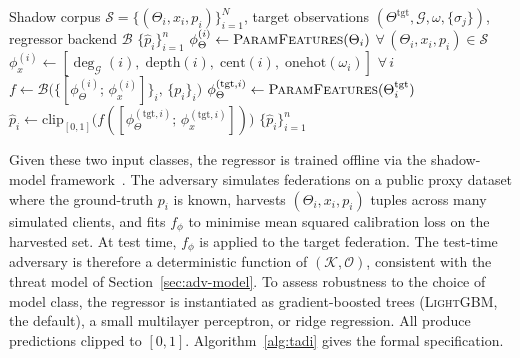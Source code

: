 \documentclass[letterpaper,journal]{IEEEtran}
\newcommand{\TADI}{\textsc{TADI}\xspace}
\begin{document}
\begin{algorithm}[t]
\caption{\TADI, full-channel variant ($\mathcal{A}_2^{\text{full}}$)}
\label{alg:tadi}
\begin{algorithmic}[1]
\REQUIRE Shadow corpus
         $\mathcal{S} = \{(\Theta_i, x_i, p_i)\}_{i=1}^{N}$,
         target observations
         $(\Theta^{\text{tgt}}, \mathcal{G}, \omega, \{\sigma_j\})$,
         regressor backend $\mathcal{B}$
\ENSURE  $\{\hat{p}_i\}_{i=1}^{n}$
\STATE $\phi_{\Theta}^{(i)} \gets \textsc{ParamFeatures}(\Theta_i)$
       $\forall\, (\Theta_i, x_i, p_i) \in \mathcal{S}$
\STATE $\phi_x^{(i)} \gets [\deg_{\mathcal{G}}(i),\;
       \mathrm{depth}(i),\; \mathrm{cent}(i),\;
       \mathrm{onehot}(\omega_i)]$
       $\forall\, i$
\STATE $f \gets \mathcal{B}\bigl(
       \{[\phi_{\Theta}^{(i)};\, \phi_x^{(i)}]\}_{i},\,
       \{p_i\}_{i}\bigr)$
  \STATE $\phi_{\Theta}^{(\text{tgt},i)} \gets
         \textsc{ParamFeatures}(\Theta_i^{\text{tgt}})$
  \STATE $\hat{p}_i \gets \mathrm{clip}_{[0,1]}\bigl(
         f([\phi_{\Theta}^{(\text{tgt},i)};\,
         \phi_x^{(\text{tgt},i)}])\bigr)$
\ENDFOR
\RETURN $\{\hat{p}_i\}_{i=1}^{n}$
\end{algorithmic}
\end{algorithm}

Given these two input classes, the regressor is trained offline via
the shadow-model framework~\cite{shokri2017membership}. The adversary
simulates federations on a public proxy dataset where the ground-truth
$p_i$ is known, harvests $(\Theta_i, x_i, p_i)$ tuples across many
simulated clients, and fits $f_\phi$ to minimise mean squared
calibration loss on the harvested set. At test time, $f_\phi$ is
applied to the target federation. The test-time adversary is
therefore a deterministic function of $(\mathcal{K}, \mathcal{O})$,
consistent with the threat model of Section~\ref{sec:adv-model}. To
assess robustness to the choice of model class, the regressor is
instantiated as gradient-boosted trees (\textsc{LightGBM}, the
default), a small multilayer perceptron, or ridge regression. All
produce predictions clipped to $[0,1]$. Algorithm~\ref{alg:tadi}
gives the formal specification.
\end{document}
